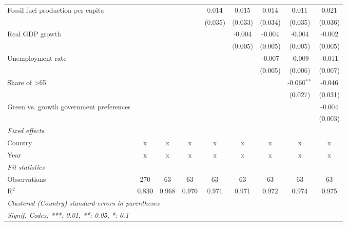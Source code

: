 \begin{table}[htbp]
\begin{tabular}{lcccccccc}
      Fossil fuel production per capita                         &         &         &         & 0.014   & 0.015   & 0.014   & 0.011         & 0.021\\   
                                                                &         &         &         & (0.035) & (0.033) & (0.034) & (0.035)       & (0.036)\\   
      Real GDP growth                                           &         &         &         &         & -0.004  & -0.004  & -0.004        & -0.002\\   
                                                                &         &         &         &         & (0.005) & (0.005) & (0.005)       & (0.005)\\   
      Unemployment rate                                         &         &         &         &         &         & -0.007  & -0.009        & -0.011\\   
                                                                &         &         &         &         &         & (0.005) & (0.006)       & (0.007)\\   
      Share of >65                                              &         &         &         &         &         &         & -0.060$^{**}$ & -0.046\\   
                                                                &         &         &         &         &         &         & (0.027)       & (0.031)\\   
      Green vs. growth government preferences                   &         &         &         &         &         &         &               & -0.004\\   
                                                                &         &         &         &         &         &         &               & (0.003)\\   
      \emph{Fixed effects}\\
      Country                                                   & x       & x       & x       & x       & x       & x       & x             & x\\  
      Year                                                      & x       & x       & x       & x       & x       & x       & x             & x\\  
      \midrule \emph{Fit statistics}\\
      Observations                                              & 270     & 63      & 63      & 63      & 63      & 63      & 63            & 63\\  
      R$^2$                                                     & 0.830   & 0.968   & 0.970   & 0.971   & 0.971   & 0.972   & 0.974         & 0.975\\  
      \midrule
      \multicolumn{9}{l}{\emph{Clustered (Country) standard-errors in parentheses}}\\
      \multicolumn{9}{l}{\emph{Signif. Codes: ***: 0.01, **: 0.05, *: 0.1}}\\
   \end{tabular}
\end{table}


